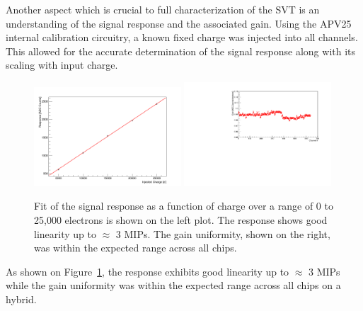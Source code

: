 Another aspect which is crucial to full characterization of the SVT is an 
understanding of the signal response and the associated gain.
Using the APV25 internal calibration circuitry, a known fixed charge was 
injected into all channels.  This allowed for the accurate determination
of the signal response along with its scaling with input charge.
\begin{figure}[h]
    \begin{center}
        \includegraphics[width=0.49\textwidth]{test2012/svtperformance/svt_calib/response_curve_fpga0_hybrid0_channel0.png}
        \includegraphics[width=0.49\textwidth]{test2012/svtperformance/svt_calib/gain_stability_fpga0_hybrid0.pdf}
        \caption{Fit of the signal response as a function of charge over a 
                 range of 0 to 25,000 electrons is shown on the left plot.
                 The response shows good linearity up to $\approx$ 3 MIPs. The
                 gain uniformity, shown on the right, was within the expected
                 range across all chips.
                }
        \label{fig:gain} 
    \end{center}
\end{figure}
As shown on Figure~\ref{fig:gain}, the response exhibits good linearity up 
to $\approx$ 3 MIPs while the gain uniformity was within the expected range 
across all chips on a hybrid.

